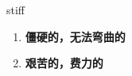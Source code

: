 
\begin{frame}
{\huge stiff}
\begin{center}
\begin{enumerate}\Large
  \item \textbf{僵硬的，无法弯曲的}
  \item \textbf{艰苦的，费力的}
\end{enumerate}
\end{center}
\end{frame}
